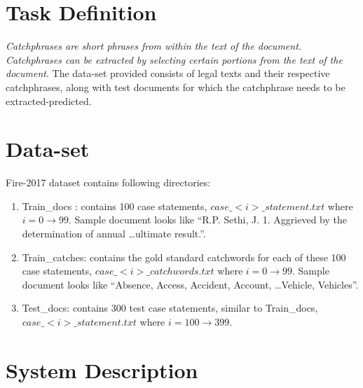 \section{Task Definition}
\label{sec:taskdef}

{\em Catchphrases are short phrases from within the text of the document. Catchphrases can be extracted by selecting certain portions from the text of the document}\cite{fire2017}. The data-set provided consists of legal texts and their respective catchphrases, along with test documents for which the catchphrase needs to be extracted-predicted.

\section{Data-set}
\label{sec:datares} 
Fire-2017 \cite{fire2017} dataset contains following directories:
\begin{enumerate}
	\item Train\_docs : contains 100 case statements, $case\_<i>\_statement.txt$ where $i = 0 \rightarrow 99$. Sample document looks like ``R.P. Sethi, J. 1. Aggrieved by the determination of annual \ldots ultimate result.''.
	\item Train\_catches: contains the gold standard catchwords for each of these 100 case statements, $case\_<i>\_catchwords.txt$ where $i = 0 \rightarrow 99$. Sample document looks like ``Absence, Access, Accident, Account, \ldots Vehicle, Vehicles''.
	\item Test\_docs: contains 300 test case statements, similar to Train\_docs, $case\_<i>\_statement.txt$ where $i = 100 \rightarrow 399$.
\end{enumerate}


\section{System Description}
\label{sec:sysdescr} 

